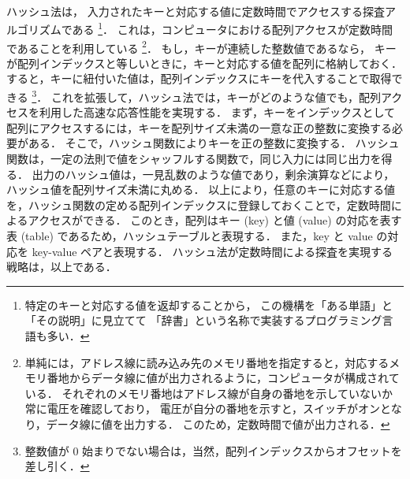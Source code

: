 \thispagestyle{empty} %

　\\
\\
\\
\\
\\
\\
\\
\\

ハッシュ法は，
入力されたキーと対応する値に定数時間でアクセスする探査アルゴリズムである
\footnote{
特定のキーと対応する値を返却することから，
この機構を「ある単語」と「その説明」に見立てて
「辞書」という名称で実装するプログラミング言語も多い．
}．
これは，コンピュータにおける配列アクセスが定数時間であることを利用している
\footnote{
単純には，アドレス線に読み込み先のメモリ番地を指定すると，対応するメモリ番地からデータ線に値が出力されるように，コンピュータが構成されている．
それぞれのメモリ番地はアドレス線が自身の番地を示していないか常に電圧を確認しており，
電圧が自分の番地を示すと，スイッチがオンとなり，データ線に値を出力する．
このため，定数時間で値が出力される．
}．
もし，キーが連続した整数値であるなら，
キーが配列インデックスと等しいときに，キーと対応する値を配列に格納しておく．
すると，キーに紐付いた値は，配列インデックスにキーを代入することで取得できる
\footnote{
整数値が 0 始まりでない場合は，当然，配列インデックスからオフセットを差し引く．
}．
これを拡張して，ハッシュ法では，キーがどのような値でも，配列アクセスを利用した高速な応答性能を実現する．
まず，キーをインデックスとして配列にアクセスするには，キーを配列サイズ未満の一意な正の整数に変換する必要がある．
そこで，ハッシュ関数によりキーを正の整数に変換する．
ハッシュ関数は，一定の法則で値をシャッフルする関数で，同じ入力には同じ出力を得る．
出力のハッシュ値は，一見乱数のような値であり，剰余演算などにより，ハッシュ値を配列サイズ未満に丸める．
以上により，任意のキーに対応する値を，ハッシュ関数の定める配列インデックスに登録しておくことで，定数時間によるアクセスができる．
このとき，配列はキー (key) と値 (value) の対応を表す表 (table) であるため，ハッシュテーブルと表現する．
また，key と value の対応を key-value ペアと表現する．
ハッシュ法が定数時間による探査を実現する戦略は，以上である．

